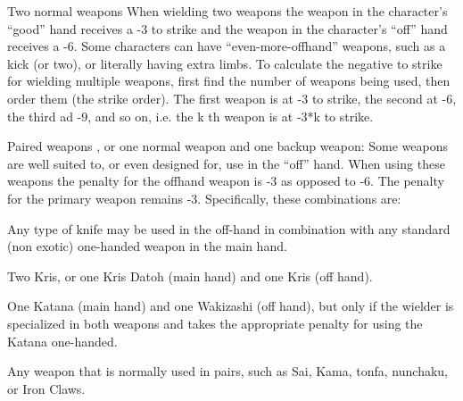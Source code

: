 \documentclass[twoside]{book}
\begin{document}
                 Two normal weapons   
                   When wielding two weapons the weapon in the
                  character’s “good” hand receives a -3
                  to strike and the weapon in the character’s
                  “off” hand receives a -6. Some characters
                  can have “even-more-offhand” weapons, such
                  as a kick (or two), or literally having extra limbs. To
                  calculate the negative to strike for wielding multiple
                  weapons, first find the number of weapons being used,
                  then order them (the strike order). The first weapon is
                  at -3 to strike, the second at -6, the third ad -9, and
                  so on, i.e. the k
                   th   weapon is at -3*k to strike. 
                  
                
                
                 Paired weapons   
                  , or one normal weapon and one backup weapon:
                  Some weapons are well suited to, or even designed for,
                  use in the “off” hand. When using these
                  weapons the penalty for the offhand weapon is -3 as
                  opposed to -6. The penalty for the primary weapon
                  remains -3. Specifically, these combinations are:
                    
                    
                         Any type of knife may be used in the
                         off-hand in combination with any standard (non
                         exotic) one-handed weapon in the main hand.
                         
                      
                    
                       Two Kris, or one Kris Datoh (main hand) and
                       one Kris (off hand). 
                      
                    
                       One Katana (main hand) and one Wakizashi
                       (off hand), but only if the wielder is specialized
                       in both weapons and takes the appropriate penalty
                       for using the Katana one-handed. 
                      
                    
                       Any weapon that is normally used in pairs,
                       such as Sai, Kama, tonfa, nunchaku, or Iron Claws.
                       
                      
                    
\end{document}
